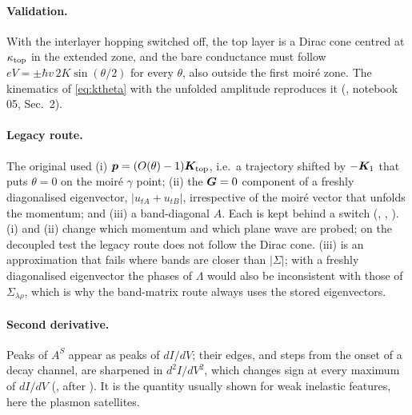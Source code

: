 \paragraph{Validation.} With the interlayer hopping switched off, the top layer is a Dirac cone centred at
$\kappa_{\rm top}$ in the extended zone, and the bare conductance must follow $eV=\pm\hbar v\,2K\sin(\theta/2)$ for every
$\theta$, also outside the first moir\'e zone. The kinematics of \cref{eq:ktheta} with the unfolded amplitude
reproduces it (, notebook 05, Sec.~2).

\paragraph{Legacy route.} The original  used (i) $\bm p=(O(\theta)-1)\bm K_{\rm top}$, i.e.\ a trajectory
shifted by $-\bm K_1$ that puts $\theta=0$ on the moir\'e $\gamma$ point; (ii) the $\bm G=0$ component of a freshly
diagonalised eigenvector, $|u_{tA}+u_{tB}|$, irrespective of the moir\'e vector that unfolds the momentum; and (iii)
a band-diagonal $A$. Each is kept behind a switch (, ,
). (i) and (ii) change which momentum and which plane wave are probed; on the decoupled
test the legacy route does not follow the Dirac cone. (iii) is an approximation that fails where bands are closer
than $|\Sigma|$; with a freshly diagonalised eigenvector the phases of $\Lambda$ would also be inconsistent with
those of $\Sigma_{\lambda\rho}$, which is why the band-matrix route always uses the stored eigenvectors.

\paragraph{Second derivative.} Peaks of $A^S$ appear as peaks of $dI/dV$; their edges, and steps from the onset of
a decay channel, are sharpened in $d^2I/dV^2$, which changes sign at every maximum of $dI/dV$
(, after ). It is the quantity usually shown for weak inelastic
features, here the plasmon satellites.
